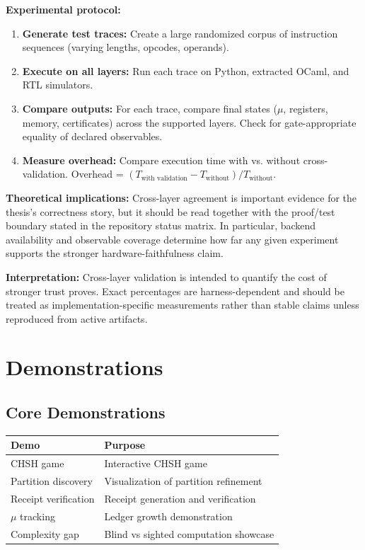 \textbf{Experimental protocol:}
\begin{enumerate}
    \item \textbf{Generate test traces:} Create a large randomized corpus of instruction sequences (varying lengths, opcodes, operands).
    
    \item \textbf{Execute on all layers:} Run each trace on Python, extracted OCaml, and RTL simulators.
    
    \item \textbf{Compare outputs:} For each trace, compare final states ($\mu$, registers, memory, certificates) across the supported layers. Check for gate-appropriate equality of declared observables.
    
    \item \textbf{Measure overhead:} Compare execution time with vs. without cross-validation. Overhead = $(T_{\text{with validation}} - T_{\text{without}}) / T_{\text{without}}$.
\end{enumerate}

\textbf{Theoretical implications:} Cross-layer agreement is important evidence for the thesis's correctness story, but it should be read together with the proof/test boundary stated in the repository status matrix. In particular, backend availability and observable coverage determine how far any given experiment supports the stronger hardware-faithfulness claim.


\textbf{Interpretation:} Cross-layer validation is intended to quantify the cost of stronger trust proves. Exact percentages are harness-dependent and should be treated as implementation-specific measurements rather than stable claims unless reproduced from active artifacts.

\section{Demonstrations}

\subsection{Core Demonstrations}

\begin{center}
\begin{tabular}{|l|l|}
\hline
\textbf{Demo} & \textbf{Purpose} \\
\hline
CHSH game & Interactive CHSH game \\
Partition discovery & Visualization of partition refinement \\
Receipt verification & Receipt generation and verification \\
$\mu$ tracking & Ledger growth demonstration \\
Complexity gap & Blind vs sighted computation showcase \\
\hline
\end{tabular}
\end{center}

